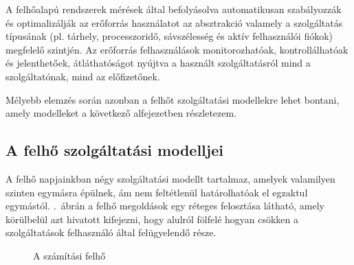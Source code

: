 A felhőalapú rendszerek mérések által befolyásolva automatikusan szabályozzák és optimalizálják az erőforrás használatot az absztrakció valamely a szolgáltatás típusának (pl. tárhely, processzoridő, sávszélesség és aktív felhasználói fiókok) megfelelő szintjén. Az erőforrás felhasználások monitorozhatóak, kontrollálhatóak és jelenthetőek, átláthatóságot nyújtva a használt szolgáltatásról mind a szolgáltatónak, mind az előfizetőnek.

Mélyebb elemzés során azonban a felhőt szolgáltatási modellekre lehet bontani, amely modelleket a következő alfejezetben részletezem.

\subsection{A felhő szolgáltatási modelljei}

A felhő napjainkban négy szolgáltatási modellt tartalmaz, amelyek valamilyen szinten egymásra épülnek, ám nem feltétlenül határolhatóak el egzaktul egymástól. .~ábrán a felhő megoldások egy réteges felosztása látható, amely körülbelül azt hivatott kifejezni, hogy alulról fölfelé hogyan csökken a szolgáltatások felhasználó által felügyelendő része.

\begin{figure}[h!]
  \centering
  \caption{A számítási felhő}
  \label{fig:topologia}
\end{figure}

